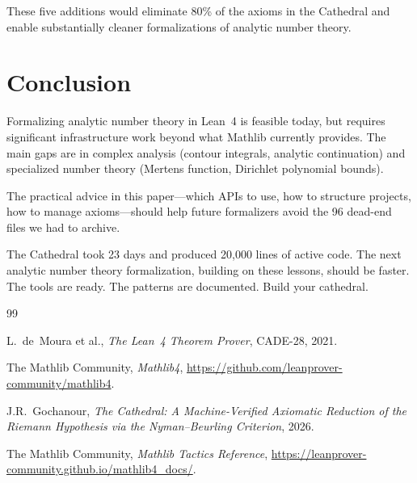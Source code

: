 \documentclass[11pt,a4paper]{article}
\begin{document}
These five additions would eliminate 80\% of the axioms in the
Cathedral and enable substantially cleaner formalizations of
analytic number theory.

\section{Conclusion}

Formalizing analytic number theory in Lean~4 is feasible today, but
requires significant infrastructure work beyond what Mathlib currently
provides. The main gaps are in complex analysis (contour integrals,
analytic continuation) and specialized number theory (Mertens function,
Dirichlet polynomial bounds).

The practical advice in this paper---which APIs to use, how to
structure projects, how to manage axioms---should help future
formalizers avoid the 96 dead-end files we had to archive.

The Cathedral took 23 days and produced 20,000 lines of active code.
The next analytic number theory formalization, building on these
lessons, should be faster. The tools are ready. The patterns are
documented. Build your cathedral.

\vspace{0.5cm}

\begin{thebibliography}{99}

L.~de~Moura et al., \emph{The Lean~4 Theorem Prover}, CADE-28, 2021.

The Mathlib Community, \emph{Mathlib4},
\url{https://github.com/leanprover-community/mathlib4}.

J.R.~Gochanour, \emph{The Cathedral: A Machine-Verified Axiomatic
Reduction of the Riemann Hypothesis via the Nyman--Beurling Criterion},
2026.

The Mathlib Community, \emph{Mathlib Tactics Reference},
\url{https://leanprover-community.github.io/mathlib4_docs/}.

\end{thebibliography}
\end{document}

